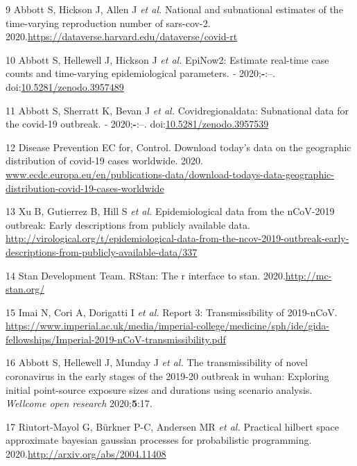 \documentclass[
]{article}
\begin{document}
\leavevmode\hypertarget{ref-dataverse}{}%
9 Abbott S, Hickson J, Allen J \emph{et al.} National and subnational
estimates of the time-varying reproduction number of sars-cov-2.
2020.\url{https://dataverse.harvard.edu/dataverse/covid-rt}

\leavevmode\hypertarget{ref-epinow2}{}%
10 Abbott S, Hellewell J, Hickson J \emph{et al.} EpiNow2: Estimate
real-time case counts and time-varying epidemiological parameters.
\emph{-} 2020;\textbf{-}:--.
doi:\href{https://doi.org/10.5281/zenodo.3957489}{10.5281/zenodo.3957489}

\leavevmode\hypertarget{ref-covidregionaldata}{}%
11 Abbott S, Sherratt K, Bevan J \emph{et al.} Covidregionaldata:
Subnational data for the covid-19 outbreak. \emph{-} 2020;\textbf{-}:--.
doi:\href{https://doi.org/10.5281/zenodo.3957539}{10.5281/zenodo.3957539}

\leavevmode\hypertarget{ref-ecdc_data}{}%
12 Disease Prevention EC for, Control. Download today's data on the
geographic distribution of covid-19 cases worldwide. 2020.
\url{www.ecdc.europa.eu/en/publications-data/download-todays-data-geographic-distribution-covid-19-cases-worldwide}

\leavevmode\hypertarget{ref-kraemer2020epidemiological}{}%
13 Xu B, Gutierrez B, Hill S \emph{et al.} Epidemiological data from the
nCoV-2019 outbreak: Early descriptions from publicly available data.
\url{http://virological.org/t/epidemiological-data-from-the-ncov-2019-outbreak-early-descriptions-from-publicly-available-data/337}

\leavevmode\hypertarget{ref-rstan}{}%
14 Stan Development Team. RStan: The r interface to stan.
2020.\url{http://mc-stan.org/}

\leavevmode\hypertarget{ref-Imai:webreport3}{}%
15 Imai N, Cori A, Dorigatti I \emph{et al.} Report 3: Transmissibility
of 2019-nCoV.
\url{https://www.imperial.ac.uk/media/imperial-college/medicine/sph/ide/gida-fellowships/Imperial-2019-nCoV-transmissibility.pdf}

\leavevmode\hypertarget{ref-Abbott:2020hj}{}%
16 Abbott S, Hellewell J, Munday J \emph{et al.} The transmissibility of
novel coronavirus in the early stages of the 2019-20 outbreak in wuhan:
Exploring initial point-source exposure sizes and durations using
scenario analysis. \emph{Wellcome open research} 2020;\textbf{5}:17.

\leavevmode\hypertarget{ref-approxGP}{}%
17 Riutort-Mayol G, Bürkner P-C, Andersen MR \emph{et al.} Practical
hilbert space approximate bayesian gaussian processes for probabilistic
programming. 2020.\url{http://arxiv.org/abs/2004.11408}
\end{document}
